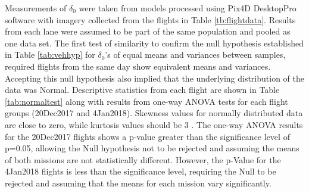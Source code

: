 \documentclass[preprint,12pt,a4paper]{elsarticle}
\begin{document}
\begin{linenumbers}
Measurements of $\delta_{0}$ were taken from models processed using Pix4D DesktopPro software with imagery collected from the flights in Table \ref{tb:flightdata}.  Results from each lane were assumed to be part of the same population and pooled as one data set. The first test of similarity to confirm the null hypothesis established in Table \ref{tab:vehhyp} for $\delta_{0}$'s of equal means and variances between samples, required flights from the same day show equivalent means and variances. Accepting this null hypothesis also implied that the underlying distribution of the data was Normal.  Descriptive statistics from each flight are shown in Table \ref{tab:normaltest} along with results from one-way ANOVA tests for each flight groups (20Dec2017 and 4Jan2018). Skewness values for normally distributed data are close to zero, while kurtosis values should be 3 \citep{NIST2013}. The one-way ANOVA results for the 20Dec2017 flights shows a p-value greater than the significance level of p=0.05, allowing the Null hypothesis not to be rejected and assuming the means of both missions are not statistically different. However, the p-Value for the 4Jan2018 flights is less than the significance level, requiring the Null to be rejected and assuming that the means for each mission vary significantly.


\end{linenumbers}
\end{document}
